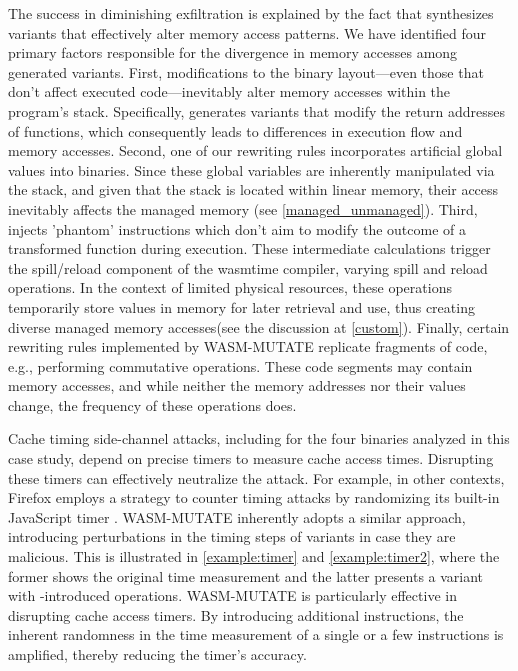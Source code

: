  The success in diminishing exfiltration is explained by the fact that \tool synthesizes variants that effectively alter memory access patterns. 
We have identified four primary factors responsible for the divergence in memory accesses among \tool generated variants.
First, modifications to the binary layout—even those that don't affect executed code—inevitably alter memory accesses within the program's stack. 
Specifically, \tool generates variants that modify the return addresses of functions, which consequently leads to differences in execution flow and memory accesses.
Second, one of our rewriting rules incorporates artificial global values into \wasm binaries. 
Since these global variables are inherently manipulated via the stack, and given that the stack is located within linear memory, their access inevitably affects the managed memory (see \autoref{managed_unmanaged}).
Third, \tool injects 'phantom' instructions which don't aim to modify the outcome of a transformed function during execution. 
These intermediate calculations trigger the spill/reload component of the wasmtime compiler, varying spill and reload operations. 
In the context of limited physical resources, these operations temporarily store values in memory for later retrieval and use, thus creating diverse managed memory accesses(see the discussion at \autoref{custom}).
Finally, certain rewriting rules implemented by WASM-MUTATE replicate fragments of code, e.g., performing commutative operations. 
These code segments may contain memory accesses, and while neither the memory addresses nor their values change, the frequency of these operations does.

 Cache timing side-channel attacks, including for the four binaries analyzed in this case study, depend on precise timers to measure cache access times. 
Disrupting these timers can effectively neutralize the attack. 
For example, in other contexts, Firefox employs a strategy to counter timing attacks by randomizing its built-in JavaScript timer \cite{10.1007/978-3-319-70972-7_13}. 
WASM-MUTATE inherently adopts a similar approach, introducing perturbations in the timing steps of \wasm variants in case they are malicious. 
This is illustrated in \autoref{example:timer} and \autoref{example:timer2}, where the former shows the original time measurement and the latter presents a variant with \tool-introduced operations.
WASM-MUTATE is particularly effective in disrupting cache access timers. 
By introducing additional instructions, the inherent randomness in the time measurement of a single or a few instructions is amplified, thereby reducing the timer's accuracy. 


